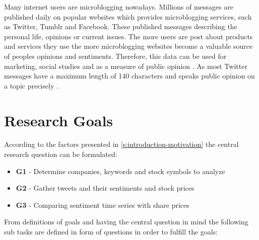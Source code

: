 Many internet users are microblogging nowadays.
Millions of messages are published daily on popular websites which provides microblogging services, such as Twitter, Tumblr and Facebook.
These published messages describing the personal life, opinions or current issues.
The more users are post about products and services they use the more microblogging websites become a valuable source of peoples opinions and sentiments.
Therefore, this data can be used for marketing, social studies and as a measure of public opinion
\citep{Patodkar2016a, Pagolu2016a}. 
As most Twitter messages have a maximum length of 140 characters and speaks public opinion on a topic precisely
\citep{Pagolu2016a}.


\section{Research Goals}
\label{s:introduction-researchgoals}

According to the factors presented in \cref{s:introduction-motivation} the central research question can be formulated:


\begin{itemize}
    \item \textbf{G1} - Determine companies, keywords and stock symbols to analyze
    \item \textbf{G2} - Gather tweets and their sentiments and stock prices
    \item \textbf{G3} - Comparing sentiment time series with share prices
\end{itemize}

From definitions of goals and having the central question in mind the following sub tasks are defined in form of questions in order to fulfill the goals:


